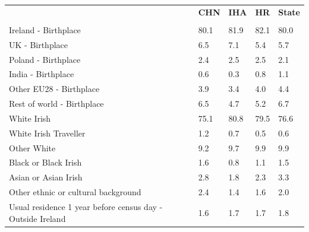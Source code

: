 \documentclass{article}
\begin{document}
\pagebreak
\begin{table}[h]	
\centering
		\begin{tabular}{KTTTT}
  \hline
& \textbf{CHN} & \textbf{IHA} & \textbf{HR}& \textbf{State}\\ 
  \hline
    \\ 
    \hline
Ireland - Birthplace & 80.1& 81.9& 82.1& 80.0\\
UK - Birthplace & 6.5& 7.1& 5.4& 5.7\\
Poland - Birthplace & 2.4& 2.5& 2.5& 2.1\\
India - Birthplace & 0.6& 0.3& 0.8& 1.1\\
Other EU28 - Birthplace & 3.9& 3.4& 4.0& 4.4\\
Rest of world - Birthplace & 6.5& 4.7& 5.2& 6.7\\
    \hline
White Irish & 75.1& 80.8& 79.5& 76.6\\
White Irish Traveller & 1.2& 0.7& 0.5& 0.6\\
Other White & 9.2& 9.7& 9.9& 9.9\\
Black or Black Irish & 1.6& 0.8& 1.1& 1.5\\
Asian or Asian Irish & 2.8& 1.8& 2.3& 3.3\\
Other ethnic or cultural background & 2.4& 1.4& 1.6& 2.0\\
    \hline
Usual residence 1 year before census day - Outside Ireland & 1.6& 1.7& 1.7& 1.8\\


\end{tabular}
\end{table}
\end{document}

